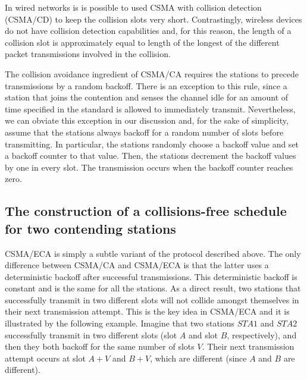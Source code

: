 \documentclass[journal]{IEEEtran}
\begin{document}
In wired networks is is possible to used CSMA with collision detection (CSMA/CD) to keep the collision slots very short.
Contrastingly, wireless devices do not have collision detection capabilities and, for this reason, the length of a collision slot is approximately equal to length of the longest of the different packet transmissions involved in the collision.


The collision avoidance ingredient of CSMA/CA requires the stations to precede transmissions by a random backoff.
There is an exception to this rule, since a station that joins the contention and senses the channel idle for an amount of time specified in the standard is allowed to immediately transmit.
Nevertheless, we can obviate this exception in our discussion and, for the sake of simplicity, assume that the stations always backoff for a random number of slots before transmitting.
In particular, the stations randomly choose a backoff value and set a backoff counter to that value.
Then, the stations decrement the backoff values by one in every slot.
The transmission occurs when the backoff counter reaches zero.

\subsection{The construction of a collisions-free schedule for two contending stations}
CSMA/ECA is simply a subtle variant of the protocol described above.
The only difference between CSMA/CA and CSMA/ECA is that the latter uses a deterministic backoff after successful transmissions.
This deterministic backoff is constant and is the same for all the stations.
As a direct result, two stations that successfully transmit in two different slots will not collide amongst themselves in their next transmission attempt.
This is the key idea in CSMA/ECA and it is illustrated by the following example.
Imagine that two stations $STA 1$ and $STA 2$ successfully transmit in two different slots (slot $A$ and slot $B$, respectively),  and then they both backoff for the same number of slots $V$.
Their next transmission attempt occurs at slot $A+V$ and $B+V$, which are different (since $A$ and $B$ are different).
\end{document}
